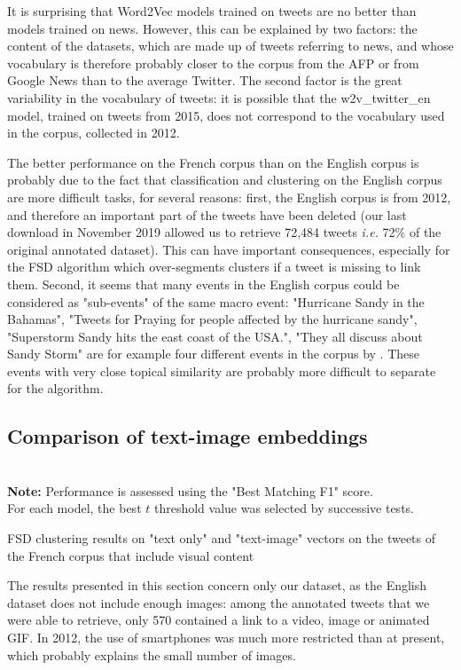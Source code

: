 It is surprising that Word2Vec models trained on tweets are no better than models trained on news. However, this can be explained by two factors: the content of the datasets, which are made up of tweets referring to news, and whose vocabulary is therefore probably closer to the corpus from the AFP or from Google News than to the average Twitter. The second factor is the great variability in the vocabulary of tweets: it is possible that the w2v\_twitter\_en model, trained on tweets from 2015, does not correspond to the vocabulary used in the \citet{mcminn_building_2013} corpus, collected in 2012.

The better performance on the French corpus than on the English corpus is probably due to the fact that classification
and clustering on the English corpus are more difficult tasks, for several reasons: first, the English corpus is from
2012, and therefore an important part of the tweets have been deleted (our last download in November 2019 allowed us to
retrieve 72,484 tweets \textit{i.e.} 72\% of the original annotated dataset). This can have important consequences,
especially for the FSD algorithm which over-segments clusters if a tweet is missing to link them.
Second, it seems that many events in the English corpus could be considered as
"sub-events" of the same macro event:
"Hurricane Sandy in the Bahamas", "Tweets for Praying for people affected by the hurricane sandy", "Superstorm Sandy
hits the east coast of the USA.", "They all discuss about Sandy Storm" are for example four different events in the
corpus by \citet{mcminn_building_2013}. These events with very close topical similarity are probably more difficult to
separate for the algorithm.

\subsection{Comparison of text-image embeddings}
\label{Subsec: text-image embeddings}
\begin{table}[ht]
\begin{center}

\\

{\scriptsize \textbf{Note:} Performance is assessed using the "Best Matching F1" score.\\ 
For each model, the best $t$ threshold value was selected by successive tests.}
\caption{FSD clustering results on "text only" and "text-image" vectors on the tweets of the French corpus that include visual content} \label{Tab: text_image}
\end{center}
\end{table}
The results presented in this section concern only our dataset, as the English dataset does not include enough images: among the annotated tweets that we were able to retrieve, only 570 contained a link to a video, image or animated GIF. In 2012, the use of smartphones was much more restricted than at present, which probably explains the small number of images.

